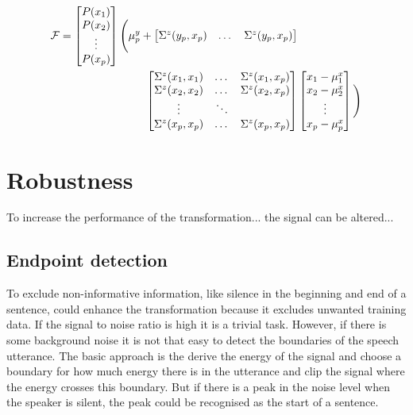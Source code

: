 \begin{equation}
	\begin{split}
		\mathcal F=\begin{bmatrix}
			P(x_1) \\
			P(x_2) \\
			\vdots \\
			P(x_p) \\
		\end{bmatrix}\Bigg(
			\mu_p^y + 
		\begin{bmatrix}
			\Sigma^z(y_p,x_p) & \dots & \Sigma^z(y_p,x_p)\\
		\end{bmatrix} & \\
		\begin{bmatrix}
			\Sigma^z(x_1,x_1) & \dots & \Sigma^z(x_1,x_p) \\
			\Sigma^z(x_2,x_2) & \dots & \Sigma^z(x_2,x_p)\\
			\vdots & \ddots & \\
			\Sigma^z(x_p,x_p) & \dots & \Sigma^z(x_p,x_p)\\
		\end{bmatrix} &
		\begin{bmatrix}
			x_1 - \mu_1^x \\
			x_2 - \mu_2^x \\
			\vdots \\
			x_p - \mu_p^x \\
		\end{bmatrix}\Bigg)
	\end{split}
\end{equation}





\section{Robustness} %
\label{sec:robustness}
To increase the performance of the transformation... the signal can be altered...

\subsection{Endpoint detection} %
\label{sub:endpoint_detection}
To exclude non-informative information, like silence in the beginning and end of a sentence, could enhance the transformation because it excludes unwanted training data. If the signal to noise ratio is high it is a trivial task. However, if there is some background noise it is not that easy to detect the boundaries of the speech utterance. The basic approach is the derive the energy of the signal and choose a boundary for how much energy there is in the utterance and clip the signal where the energy crosses this boundary. But if there is a peak in the noise level when the speaker is silent, the peak could be recognised as the start of a sentence.

